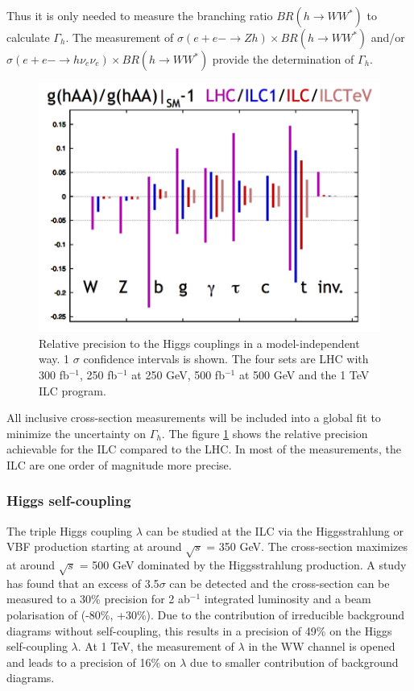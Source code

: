 Thus it is only needed to measure the branching ratio $BR(h \rightarrow WW^*)$ to calculate $\Gamma_{h}$. The measurement of $\sigma(e+e- \rightarrow Zh) \times BR(h \rightarrow WW^*)$ and/or $\sigma(e+e- \rightarrow h\nu_e\nu_e) \times BR(h \rightarrow WW^*)$ provide the determination of $\Gamma_{h}$.
\begin{figure}[htbp!]
  \centering
  \includegraphics[width=0.6\linewidth]{chap2/fig/HiggsCouplings.png}
  \caption{Relative precision to the Higgs couplings in a model-independent way. 1 $\sigma$ confidence intervals is shown. The four sets are LHC with 300 fb$^{-1}$, 250 fb$^{-1}$ at 250 GeV, 500 fb$^{-1}$ at 500 GeV and the 1 TeV ILC program.}  \label{fig:HiggsCouplings}
\end{figure}

All inclusive cross-section measurements will be included into a global fit to minimize the uncertainty on $\Gamma_{h}$. The figure \ref{fig:HiggsCouplings} shows the relative precision achievable for the ILC compared to the LHC. In most of the measurements, the ILC are one order of magnitude more precise.

\subsubsection{Higgs self-coupling}

The triple Higgs coupling $\lambda$ can be studied at the ILC via the Higgsstrahlung or VBF production starting at around $\sqrt{s}$ = 350 GeV. The cross-section maximizes at around $\sqrt{s}$ = 500 GeV dominated by the Higgsstrahlung production. A study \cite{Duerig:2016dvi} has found that an excess of 3.5$\sigma$ can be detected and the cross-section can be measured to a 30\% precision for 2 ab$^{-1}$ integrated luminosity and a beam polarisation of (-80\%, +30\%). Due to the contribution of irreducible background diagrams without self-coupling, this results in a precision of 49\% on the Higgs self-coupling $\lambda$. At 1 TeV, the measurement of $\lambda$ in the WW channel is opened and leads to a precision of 16\% on $\lambda$ due to smaller contribution of background diagrams.

